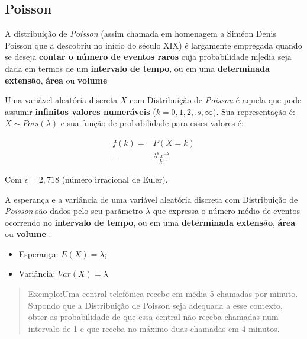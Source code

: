 \documentclass[
]{book}
\providecommand{\tightlist}{%
  \setlength{\itemsep}{0pt}\setlength{\parskip}{0pt}}
\begin{document}
\hypertarget{poisson}{%
\subsection{Poisson}\label{poisson}}

A distribuição de \emph{Poisson} (assim chamada em homenagem a Siméon Denis Poisson que a descobriu no início do século XIX) é largamente empregada quando se deseja \textbf{contar o número de eventos raros} cuja probabilidade m{[}edia seja dada em termos de um \textbf{intervalo de tempo}, ou em uma \textbf{determinada extensão}, \textbf{área} ou \textbf{volume}

\hfill\break

Uma variável aleatória discreta \(X\) com Distribuição de \emph{Poisson} é aquela que pode assumir \textbf{infinitos valores numeráveis} (\(k=0,1,2, .s, \infty\)). Sua representação é: \(X \sim Pois (\lambda)\) e sua função de probabilidade para esses valores é:

\hfill\break

\begin{align*}
f(k) = & P(X=k) \\
     = & \frac{\lambda ^{k}. \epsilon^{-\lambda}} {k!} 
\end{align*}

Com \(\epsilon= 2,718\) (número irracional de Euler).

\hfill\break

A esperança e a variância de uma variável aleatória discreta com Distribuição de \emph{Poisson} são dados pelo seu parãmetro \(\lambda\) que expressa o número médio de eventos ocorrendo no \textbf{intervalo de tempo}, ou em uma \textbf{determinada extensão}, \textbf{área} ou \textbf{volume} :

\begin{itemize}
\tightlist
\item
  Esperança: \(E(X) = \lambda\);\\
\item
  Variância: \(Var(X) = \lambda\)
\end{itemize}

\hfill\break

\begin{quote}
Exemplo:Uma central telefônica recebe em média 5 chamadas por minuto. Supondo que a Distribuição de Poisson seja adequada a esse contexto, obter as probabilidade de que essa central não receba chamadas num intervalo de 1 e que receba no máximo duas chamadas em 4 minutos.
\end{quote}
\end{document}
